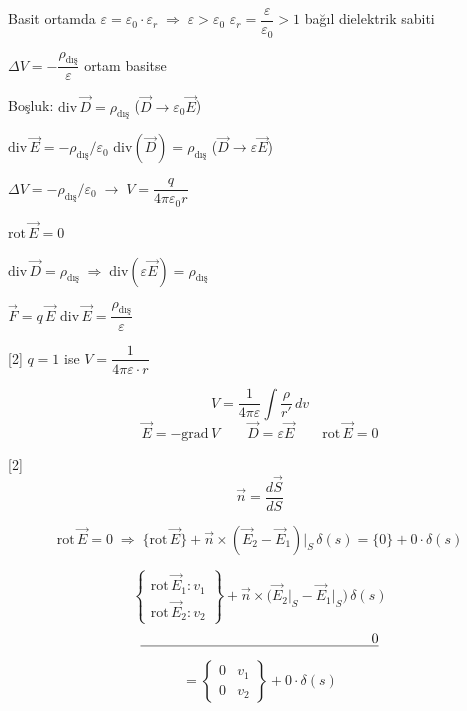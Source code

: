 \documentclass[11pt,a4paper]{article}
\begin{document}
Basit ortamda $\varepsilon = \varepsilon_0\cdot\varepsilon_r \;\Rightarrow\; \varepsilon > \varepsilon_0$ \qquad $\varepsilon_r = \dfrac{\varepsilon}{\varepsilon_0} > 1$ bağıl dielektrik sabiti

$\Delta V = -\dfrac{\rho_{\text{dış}}}{\varepsilon}$ \quad ortam basitse

\noindent
\begin{minipage}[t]{0.5\linewidth}
Boşluk: $\mathrm{div}\,\vec D = \rho_{\text{dış}}$ \quad ($\vec D \to \varepsilon_0\vec E$)

$\mathrm{div}\,\vec E = -\rho_{\text{dış}}/\varepsilon_0$ \qquad $\mathrm{div}(\vec D) = \rho_{\text{dış}}$ \quad ($\vec D \to \varepsilon\vec E$)

$\Delta V = -\rho_{\text{dış}}/\varepsilon_0 \;\longrightarrow\; V = \dfrac{q}{4\pi\varepsilon_0 r}$
\end{minipage}\hfill
\begin{minipage}[t]{0.46\linewidth}
$\mathrm{rot}\,\vec E = 0$

$\mathrm{div}\,\vec D = \rho_{\text{dış}} \;\Rightarrow\; \mathrm{div}(\varepsilon\vec E) = \rho_{\text{dış}}$

$\vec F = q\,\vec E$ \qquad $\mathrm{div}\,\vec E = \dfrac{\rho_{\text{dış}}}{\varepsilon}$
\end{minipage}

[2]
$q=1$ ise \quad $V = \dfrac{1}{4\pi\varepsilon\cdot r}$

\[ V = \frac{1}{4\pi\varepsilon}\int\frac{\rho}{r'}\,dv \]
\[ \vec E = -\mathrm{grad}\,V \qquad \vec D = \varepsilon\vec E \qquad \mathrm{rot}\,\vec E = 0 \]

\medskip\noindent\hrulefill\medskip

[2]
\[ \vec n = \frac{d\vec S}{dS} \]

\[ \mathrm{rot}\,\vec E=0 \;\Rightarrow\; \{\mathrm{rot}\,\vec E\} + \vec n\times(\vec E_2-\vec E_1)\big|_S\,\delta(s) = \{0\} + 0\cdot\delta(s) \]

\[ \left\{\begin{array}{l}\mathrm{rot}\,\vec E_1 : v_1\\ \mathrm{rot}\,\vec E_2 : v_2\end{array}\right\} + \vec n\times\bigl(\vec E_2\big|_S-\vec E_1\big|_S\bigr)\,\delta(s) \]
\[ \overset{\makebox[6cm][r]{$0$}}{\rule{6cm}{0.4pt}} \]
\[ = \left\{\begin{array}{ll}0 & v_1\\ 0 & v_2\end{array}\right\} + 0\cdot\delta(s) \]
\end{document}
